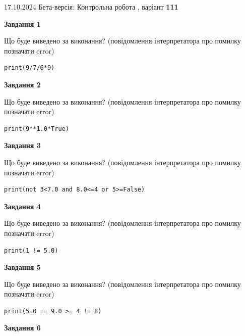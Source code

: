 \documentclass[12pt, ukrainian]{article}
\begin{document}
{\Large{17.10.2024 Бета-версія: Контрольна робота , варіант  \No \textbf { 111 }\par}}
{
\begin {large}
{\begin {center}\textbf{Завдання 1}\end {center}}

Що буде виведено за виконання? (повідомлення інтерпретатора про помилку позначати error)\par
\begin{verbatim}
print(9/7/6*9)
\end{verbatim}

{\begin {center}\textbf{Завдання 2}\end {center}}

Що буде виведено за виконання? (повідомлення інтерпретатора про помилку позначати error)\par
\begin{verbatim}
print(9**1.0*True)
\end{verbatim}

{\begin {center}\textbf{Завдання 3}\end {center}}

Що буде виведено за виконання? (повідомлення інтерпретатора про помилку позначати error)\par
\begin{verbatim}
print(not 3<7.0 and 8.0<=4 or 5>=False)
\end{verbatim}

{\begin {center}\textbf{Завдання 4}\end {center}}

Що буде виведено за виконання? (повідомлення інтерпретатора про помилку позначати error)\par
\begin{verbatim}
print(1 != 5.0)
\end{verbatim}

{\begin {center}\textbf{Завдання 5}\end {center}}

Що буде виведено за виконання? (повідомлення інтерпретатора про помилку позначати error)\par
\begin{verbatim}
print(5.0 == 9.0 >= 4 != 8)
\end{verbatim}

{\begin {center}\textbf{Завдання 6}\end {center}}


\end{large}}
\end{document}
